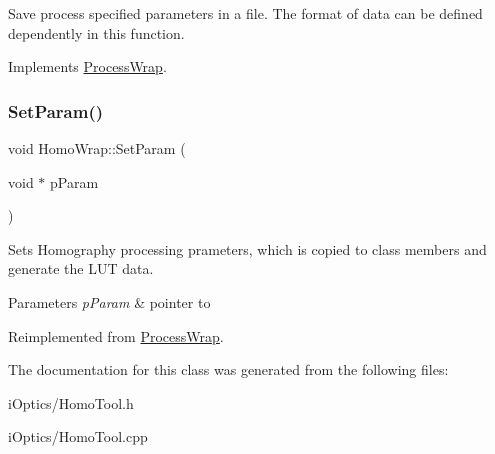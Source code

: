 Save process specified parameters in a file. The format of data can be defined dependently in this function. 

Implements \mbox{\hyperlink{class_process_wrap_aa5d4361a42a7a65cac877beb6d4ffa97}{Process\+Wrap}}.

\mbox{\label{class_homo_wrap_aecc7d5180e979679ad9e41ceaa846d05}} 
\subsubsection{\texorpdfstring{Set\+Param()}{SetParam()}}
{\footnotesize\ttfamily void Homo\+Wrap\+::\+Set\+Param (\begin{DoxyParamCaption}\item[{void $\ast$}]{p\+Param }\end{DoxyParamCaption})\hspace{0.3cm}{\ttfamily [virtual]}}

Sets Homography processing prameters, which is copied to class members and generate the L\+UT data. 
\begin{DoxyParams}{Parameters}
{\em p\+Param} & pointer to \\
\hline
\end{DoxyParams}


Reimplemented from \mbox{\hyperlink{class_process_wrap_a6c7130837d4713b0462f42cfc25aca98}{Process\+Wrap}}.



The documentation for this class was generated from the following files\+:\begin{DoxyCompactItemize}
\item 
i\+Optics/Homo\+Tool.\+h\item 
i\+Optics/Homo\+Tool.\+cpp\end{DoxyCompactItemize}

